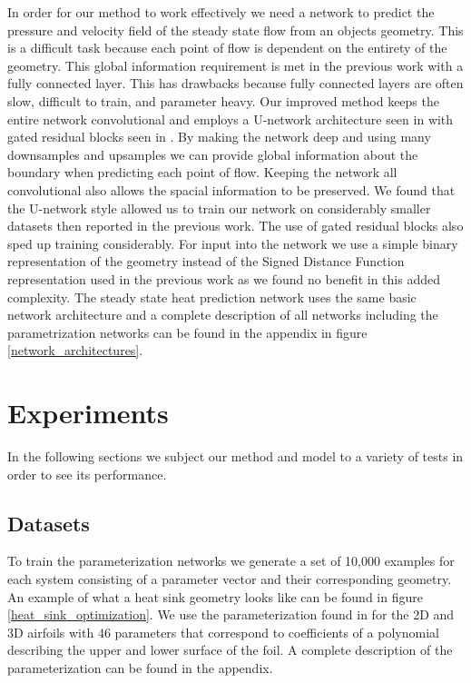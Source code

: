 \documentclass{article} %
\begin{document}
In order for our method to work effectively we need a network to predict the pressure and velocity field of the steady state flow from an objects geometry. This is a difficult task because each point of flow is dependent on the entirety of the geometry. This global information requirement is met in the previous work \citep{guo2016convolutional} with a fully connected layer. This has drawbacks because fully connected layers are often slow, difficult to train, and parameter heavy. Our improved method keeps the entire network convolutional and employs a U-network architecture seen in \citet{DBLP:journals/corr/RonnebergerFB15} with gated residual blocks seen in \citet{salimans2017pixelcnn++}. By making the network deep and using many downsamples and upsamples we can provide global information about the boundary when predicting each point of flow. Keeping the network all convolutional also allows the spacial information to be preserved. We found that the U-network style allowed us to train our network on considerably smaller datasets then reported in the previous work. The use of gated residual blocks also sped up training considerably. For input into the network we use a simple binary representation of the geometry instead of the Signed Distance Function representation used in the previous work as we found no benefit in this added complexity. The steady state heat prediction network uses the same basic network architecture and a complete description of all networks including the parametrization networks can be found in the appendix in figure \ref{network_architectures}.

\section{Experiments}

In the following sections we subject our method and model to a variety of tests in order to see its performance.

\subsection{Datasets}

To train the parameterization networks we generate a set of 10,000 examples for each system consisting of a parameter vector and their corresponding geometry. An example of what a heat sink geometry looks like can be found in figure \ref{heat_sink_optimization}. We use the parameterization found in \citet{lane2009surface} for the 2D and 3D airfoils with 46 parameters that correspond to coefficients of a polynomial describing the upper and lower surface of the foil. A complete description of the parameterization can be found in the appendix.
\end{document}
